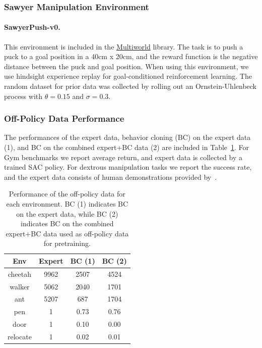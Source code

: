 \subsubsection{Sawyer Manipulation Environment}

\paragraph{SawyerPush-v0.} This environment is included in the \href{https://github.com/vitchyr/multiworld}{Multiworld} library. The task is to push a puck to a goal position in a 40cm x 20cm, and the reward function is the negative distance between the puck and goal position. When using this environment, we use hindsight experience replay for goal-conditioned reinforcement learning. The random dataset for prior data was collected by rolling out an Ornstein-Uhlenbeck process with $\theta = 0.15$ and $\sigma = 0.3$.

\subsubsection{Off-Policy Data Performance}

The performances of the expert data, behavior cloning (BC) on the expert data (1), and BC on the combined expert+BC data (2) are included in Table~\ref{fig:bc}. For Gym benchmarks we report average return, and expert data is collected by a trained SAC policy. For dextrous manipulation tasks we report the success rate, and the expert data consists of human demonstrations provided by~\citet{rajeswaran2018dextrous}.

\begin{table}[h!]
\footnotesize
\begin{tabular}{c|c|c|c}
Env         & Expert & BC (1) & BC (2) \\ \hline
cheetah & 9962   & 2507         & 4524      \\
walker      & 5062   & 2040         & 1701      \\
ant         & 5207   & 687          & 1704      \\
pen         & 1      & 0.73          & 0.76       \\
door        & 1      & 0.10          & 0.00       \\
relocate    & 1      & 0.02          & 0.01       \\
\end{tabular}
\caption{Performance of the off-policy data for each environment. BC (1) indicates BC on the expert data, while BC (2) indicates BC on the combined expert+BC data used as off-policy data for pretraining. }
\label{fig:bc}
\end{table}

